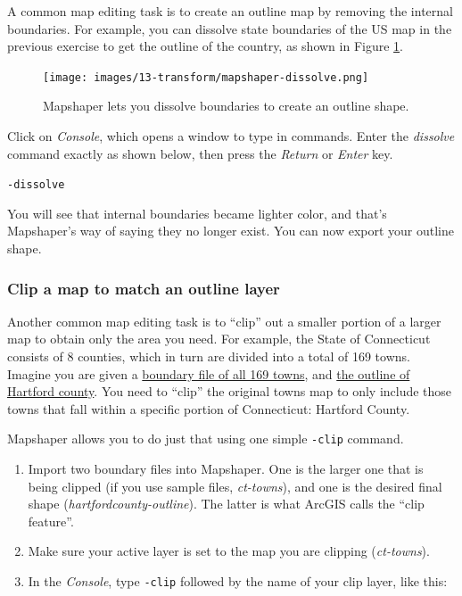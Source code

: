 \documentclass[
  english,
]{book}
\begin{document}
A common map editing task is to create an outline map by removing the internal boundaries. For example, you can dissolve
state boundaries of the US map in the previous exercise to get the outline of the country, as shown in
Figure \ref{fig:mapshaper-dissolve}.



\begin{figure}
\centering
\texttt{[image: images/13-transform/mapshaper-dissolve.png]}
\caption{\label{fig:mapshaper-dissolve}Mapshaper lets you dissolve boundaries to create an outline shape.}
\end{figure}

Click on \emph{Console}, which opens a window to type in commands. Enter the \emph{dissolve} command exactly as shown below, then press the \emph{Return} or \emph{Enter} key.

\texttt{-dissolve}

You will see that internal boundaries became lighter color, and that's Mapshaper's way of saying they no longer exist.
You can now export your outline shape.

\hypertarget{clip-a-map-to-match-an-outline-layer}{%
\subsubsection*{Clip a map to match an outline layer}\label{clip-a-map-to-match-an-outline-layer}}

Another common map editing task is to ``clip'' out a smaller portion of a larger map to obtain only the area you need. For example, the State of Connecticut consists of 8 counties, which in turn are divided into a total of 169 towns.
Imagine you are given a \href{data/ct-towns.geojson}{boundary file of all 169 towns}, and \href{data/hartfordcounty-outline.geojson}{the outline of Hartford county}.
You need to ``clip'' the original towns map to only include those towns that fall within a specific portion of Connecticut: Hartford County.

Mapshaper allows you to do just that using one simple \texttt{-clip} command.

\begin{enumerate}
\def\labelenumi{\arabic{enumi}.}
\item
  Import two boundary files into Mapshaper. One is the larger one that is being clipped (if you use sample files, \emph{ct-towns}),
  and one is the desired final shape (\emph{hartfordcounty-outline}). The latter is what ArcGIS calls the ``clip feature''.
\item
  Make sure your active layer is set to the map you are clipping (\emph{ct-towns}).
\item
  In the \emph{Console}, type \texttt{-clip} followed by the name of your clip layer, like this:
\end{enumerate}
\end{document}
